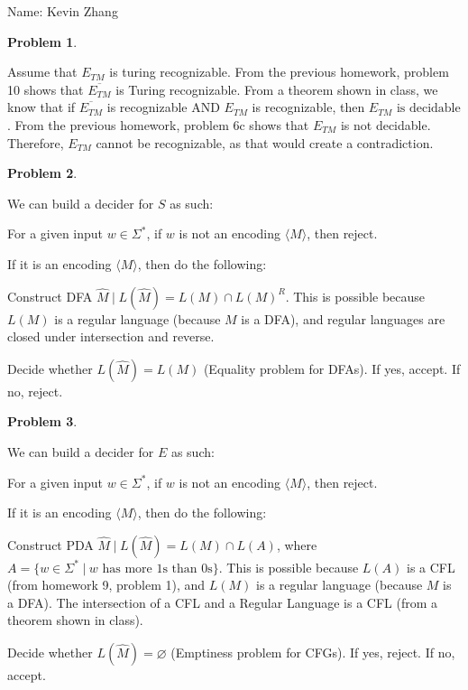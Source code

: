\documentclass[11pt]{article}
\newcommand{\yourname}{Kevin Zhang}
\newcommand{\pipe}{\hspace{3pt}|\hspace{3pt}}
\theoremstyle{definition}
\theoremstyle{case}
\theoremstyle{theorem}
\newtheorem{prob}{Problem}
\begin{document}
{\large
\noindent Name: \yourname}

\vspace{15pt}

\begin{prob}\end{prob}

Assume that $E_{TM}$ is turing recognizable. 
From the previous homework, problem 10 shows that $\overline{E_{TM}}$ is Turing recognizable.
From a theorem shown in class, we know that if $\overline{E_{TM}}$ is recognizable AND $E_{TM}$ is recognizable,
then $E_{TM}\text{ is decidable}$. From the previous homework, problem 6c shows that $E_{TM}$ is not 
decidable. Therefore, $E_{TM}$ cannot be recognizable, as that would create a contradiction.

\begin{prob}\end{prob}

We can build a decider for $S$ as such:

For a given input $w \in \Sigma^*$, if $w$ is not an encoding $\langle M \rangle$, then reject. 

If it is an encoding $\langle M \rangle$, then do the following:

Construct DFA $\hat{M} \pipe L(\hat{M}) = L(M) \cap L(M)^R$. This is possible because
$L(M)$ is a regular language (because $M$ is a DFA), and regular languages are closed
under intersection and reverse. 

Decide whether $L(\hat{M}) = L(M)$ (Equality problem for DFAs). If yes, accept. If no, reject. 

\begin{prob}\end{prob}

We can build a decider for $E$ as such:

For a given input $w \in \Sigma^*$, if $w$ is not an encoding $\langle M \rangle$, then reject.

If it is an encoding $\langle M \rangle$, then do the following:

Construct PDA $\hat{M} \pipe L(\hat{M}) = L(M) \cap L(A)$, where 
$A = \{ w \in \Sigma^* \pipe w \text{ has more 1s than 0s}\}$. This is possible because $L(A)$ is
a CFL (from homework 9, problem 1), and $L(M)$ is a regular language (because $M$ is a DFA). 
The intersection of a CFL and a Regular Language is a CFL (from a theorem shown in class).

Decide whether $L(\hat{M}) = \varnothing$ (Emptiness problem for CFGs). If yes, reject. If no, accept.
\end{document}
